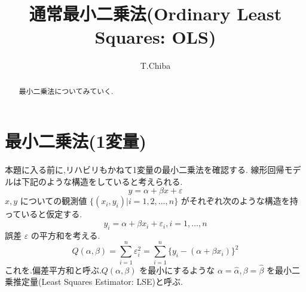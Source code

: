 \documentclass{jsarticle}
\title{通常最小二乗法(Ordinary Least Squares: OLS)}
\author{T.Chiba}
\theoremstyle{plain}
\begin{document}
  \maketitle
  \begin{abstract}
    最小二乗法についてみていく.
  \end{abstract}
  \section{最小二乗法(1変量)}
    本題に入る前に,リハビリもかねて1変量の最小二乗法を確認する.
    線形回帰モデルは下記のような構造をしていると考えられる.
  \begin{equation}
    y = \alpha + \beta x + \varepsilon
  \end{equation}
    $x, y$ についての観測値 $\{(x_i, y_i) | i = 1,2,\ldots,n\}$ がそれぞれ次のような構造を持っていると仮定する.
  \begin{equation}
    y_i = \alpha + \beta x_i + \varepsilon_i, i = 1,\ldots,n
  \end{equation}
  誤差 $\varepsilon$ の平方和を考える.
  \begin{equation}
    Q(\alpha, \beta) = \sum_{i=1}^n \varepsilon_i^2 = \sum_{i=1}^n \{y_i - (\alpha + \beta x_i) \}^2
  \end{equation}
  これを.偏差平方和と呼ぶ.$Q(\alpha, \beta)$ を最小にするような $\alpha = \hat{\alpha}, \beta = \hat{\beta}$ を最小二乗推定量(Least Squares Estimator: LSE)と呼ぶ.
\end{document}
